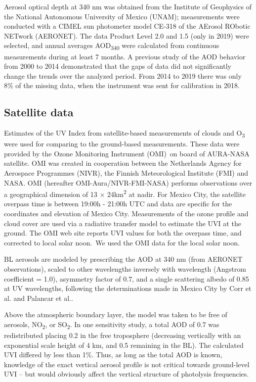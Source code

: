 \documentclass[10pt]{article}
\begin{document}
Aerosol optical depth at 340 nm was obtained from the Institute of
Geophysics of the National Autonomous University of Mexico (UNAM);
measurements were conducted with a CIMEL sun photometer model CE-318 of
the AErosol RObotic NETwork (AERONET\cite{Holben_1998}). The data
Product Level 2.0 and 1.5 (only in 2019) were selected, and annual
averages AOD\textsubscript{340} were calculated from continuous
measurements during at least 7 months. A previous study of the AOD
behavior from 2000 to 2014 demonstrated that the gaps of data did not
significantly change the trends over the analyzed
period.\cite{Carabali_2017} From 2014 to 2019 there was only 8\% of the
missing data, when the instrument was sent for calibration in 2018.

\subsection*{Satellite data}

{\label{800866}}

Estimates of the UV Index from satellite-based measurements of clouds
and O\textsubscript{3} were used for comparing to the ground-based
measurements. These data were provided by the Ozone Monitoring
Instrument (OMI)~on board of AURA-NASA satellite.\cite{dcio} OMI
was created in cooperation between the Netherlands Agency for Aerospace
Programmes (NIVR), the Finnish Meteorological Institute (FMI) and NASA.
OMI (hereafter OMI-Aura/NIVR-FMI-NASA) performs observations over a
geographical dimension of 13 × 24km\textsuperscript{2} at nadir. For
Mexico City, the satellite overpass time is between 19:00h - 21:00h UTC
and data are specific for the coordinates and elevation of Mexico City.
Measurements of the ozone profile and cloud cover are used via a
radiative transfer model to estimate the UVI at the ground. The OMI web
site reports UVI values for both the overpass time, and corrected to
local solar noon.~We used the OMI data for the local solar noon.

BL aerosols are modeled by prescribing the AOD at 340 nm (from AERONET
observations), scaled to other wavelengths inversely with wavelength
(Angstrom coefficient = 1.0), asymmetry factor of 0.7, and a single
scattering albedo of 0.85 at UV wavelengths, following the
determinations made in Mexico City by Corr et al.\cite{Corr_2009} and
Palancar et al.\cite{Palancar_2013}.

Above the atmospheric boundary layer, the model was taken to be free of
aerosols, NO\textsubscript{2}, or SO\textsubscript{2}. In one
sensitivity study, a total AOD of 0.7 was redistributed placing 0.2 in
the free troposphere (decreasing vertically with an exponential scale
height of 4 km, and 0.5 remaining in the BL). The calculated UVI
differed by less than 1\%. Thus, as long as the total AOD is known,
knowledge of the exact vertical aerosol profile is not critical towards
ground-level UVI -- but would obviously affect the vertical structure of
photolysis frequencies.
\end{document}
